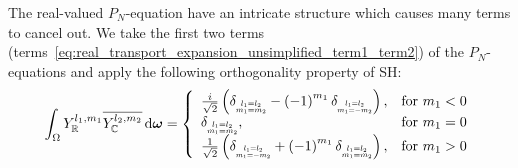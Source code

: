 The real-valued $P_N$-equation have an intricate structure which causes many terms to cancel out. We take the first two terms (terms~\ref{eq:real_transport_expansion_unsimplified_term1_term2}) of the $P_N$-equations and apply the following orthogonality property of SH:
\begin{align}
\int_\Omega{\SHBR^{l_1, m_1}\overline{\SHBC^{l_2, m_2}}}\ud\vec{\omega}
=
\left\{
\begin{array}{lr}
\frac{i}{\sqrt{2}}
\left(
\delta_{\scaleto{\substack{l_1=l_2\\m_1=m_2}}{9pt}}
-\left({-1}\right)^{m_1}
\delta_{\scaleto{\substack{l_1=l_2\\m_1=-m_2}}{9pt}}
\right)
, & \text{for } m_1 < 0
\\
\delta_{\scaleto{\substack{l_1=l_2\\m_1=m_2}}{9pt}}, & \text{for } m_1 = 0
\\
\frac{1}{\sqrt{2}}
\left(
\delta_{\scaleto{\substack{l_1=l_2\\m_1=-m_2}}{9pt}}
+\left({-1}\right)^{m_1}
\delta_{\scaleto{\substack{l_1=l_2\\m_1=m_2}}{9pt}}
\right)
, & \text{for } m_1 > 0
\end{array}
\right.
\label{eq:real_orthogonality_property_with_complex}
\end{align}

